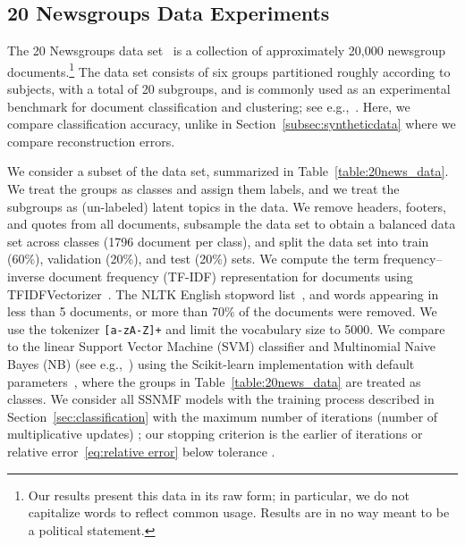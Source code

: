 \documentclass[twocolumn,10pt]{article}
\begin{document}
\subsection{20 Newsgroups Data Experiments}\label{subsec:20newsdata}
    The 20 Newsgroups data set~\cite{20news} is a collection of approximately 20,000 newsgroup documents.\footnote{Our results present this data in its raw form; in particular, we do not capitalize words to reflect common usage. Results are in no way meant to be a political statement.}
The data set consists of six groups partitioned roughly according to subjects, with a total of 20 subgroups, and is commonly used as an experimental benchmark for 
document classification and 
clustering; see e.g.,~\cite{lee2009semi}. Here, we compare classification accuracy, unlike in Section~\ref{subsec:syntheticdata} where we compare reconstruction errors.

We consider a subset of the data set, summarized in Table~\ref{table:20news_data}. We treat the groups as classes and assign them labels, and we treat the subgroups as (un-labeled) latent topics in the data.  We remove headers, footers, and quotes from all documents, subsample the data set to obtain a balanced data set across classes (1796 document per class), and split the data set into train (60\%), validation (20\%), and test (20\%) sets.
We compute the term frequency–inverse document frequency (TF-IDF) representation for documents
using TFIDFVectorizer~\cite{scikit-learn}.
The NLTK English stopword list~\cite{nltk}, and words appearing in less than 5 documents, or more than 70\% of the documents were removed.
We use the tokenizer \texttt{[a-zA-Z]+}
and limit the vocabulary size to 5000.
We 
compare to the linear Support Vector Machine (SVM) classifier and Multinomial Naive Bayes (NB) (see e.g.,~\cite{manning2008introduction}) using the Scikit-learn implementation with default parameters~\cite{scikit-learn}, where the groups in Table~\ref{table:20news_data} are treated as classes.
We consider all SSNMF models with the training process described in Section~\ref{sec:classification} with the maximum number of iterations (number of multiplicative updates) ; our stopping criterion is the earlier of  iterations or relative error~\eqref{eq:relative error} below tolerance . 
\end{document}
